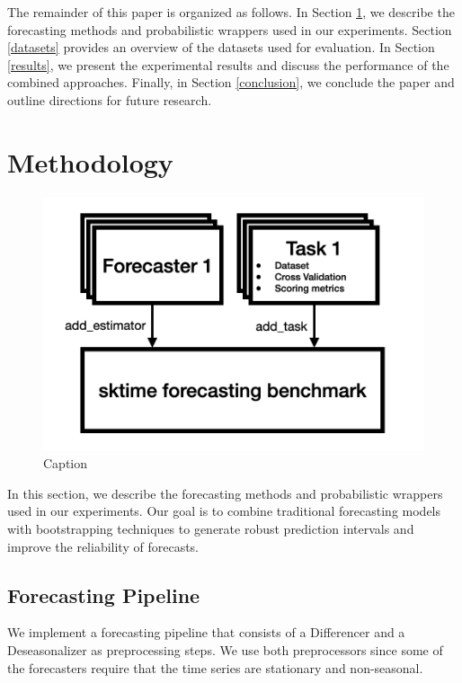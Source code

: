The remainder of this paper is organized as follows. In Section \ref{methods}, we describe the forecasting methods and probabilistic wrappers used in our experiments. Section \ref{datasets} provides an overview of the datasets used for evaluation. In Section \ref{results}, we present the experimental results and discuss the performance of the combined approaches. Finally, in Section \ref{conclusion}, we conclude the paper and outline directions for future research.

\section{Methodology} \label{methods}

\begin{figure}
    \centering
    \includegraphics[width=.5\textwidth]{Figures/evaluationFramework.png}
    \caption{Caption}
    \label{fig:enter-label}
\end{figure}
In this section, we describe the forecasting methods and probabilistic wrappers used in our experiments. Our goal is to combine traditional forecasting models with bootstrapping techniques to generate robust prediction intervals and improve the reliability of forecasts.

\subsection{Forecasting Pipeline}
We implement a forecasting pipeline that consists of a Differencer and a Deseasonalizer as preprocessing steps. We use both preprocessors since some of the forecasters require that the time series are stationary and non-seasonal.

